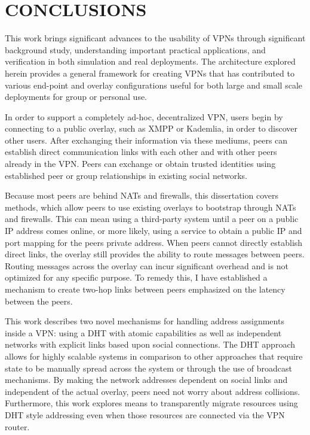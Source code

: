 \chapter{CONCLUSIONS}
\label{chap:conclusion}

This work brings significant advances to the usability of VPNs through
significant background study, understanding important practical applications,
and verification in both simulation and real deployments.  The architecture
explored herein provides a general framework for creating VPNs that has
contributed to various end-point and overlay configurations useful for both
large and small scale deployments for group or personal use.

In order to support a completely ad-hoc, decentralized VPN, users begin by
connecting to a public overlay, such as XMPP or Kademlia, in order to discover
other users.  After exchanging their information via these mediums, peers can
establish direct communication links with each other and with other peers
already in the VPN.  Peers can exchange or obtain trusted identities using
established peer or group relationships in existing social networks.

Because most peers are behind NATs and firewalls, this dissertation covers
methods, which allow peers to use existing overlays to bootstrap through NATs
and firewalls.  This can mean using a third-party system until a peer on a
public IP address comes online, or more likely, using a service to obtain a
public IP and port mapping for the peers private address.  When peers cannot
directly establish direct links, the overlay still provides the ability to
route messages between peers.  Routing messages across the overlay can incur
significant overhead and is not optimized for any specific purpose.  To remedy
this, I have established a mechanism to create two-hop links between peers
emphasized on the latency between the peers.

This work describes two novel mechanisms for handling address assignments
inside a VPN:  using a DHT with atomic capabilities as well as independent
networks with explicit links based upon social connections.  The DHT approach
allows for highly scalable systems in comparison to other approaches that
require state to be manually spread across the system or through the use of
broadcast mechanisms.  By making the network addresses dependent on social
links and independent of the actual overlay, peers need not worry about address
collisions.  Furthermore, this work explores means to transparently migrate
resources using DHT style addressing even when those resources are connected
via the VPN router.

